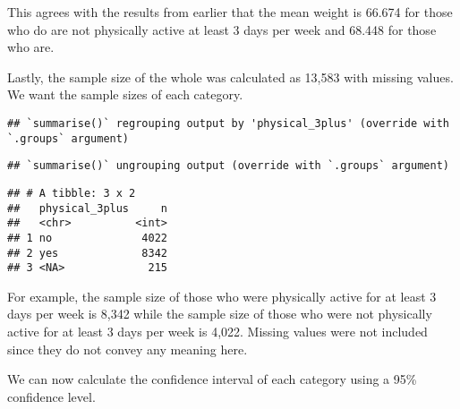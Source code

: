 \documentclass[
]{article}
\newenvironment{Shaded}{\begin{snugshade}}{\end{snugshade}}
\newcommand{\DataTypeTok}[1]{\textcolor[rgb]{0.13,0.29,0.53}{#1}}
\newcommand{\KeywordTok}[1]{\textcolor[rgb]{0.13,0.29,0.53}{\textbf{#1}}}
\newcommand{\NormalTok}[1]{#1}
\newcommand{\OperatorTok}[1]{\textcolor[rgb]{0.81,0.36,0.00}{\textbf{#1}}}
\newcommand{\StringTok}[1]{\textcolor[rgb]{0.31,0.60,0.02}{#1}}
\begin{document}
This agrees with the results from earlier that the mean weight is 66.674
for those who do are not physically active at least 3 days per week and
68.448 for those who are.

Lastly, the sample size of the whole was calculated as 13,583 with
missing values. We want the sample sizes of each category.

\begin{Shaded}
\end{Shaded}

\begin{verbatim}
## `summarise()` regrouping output by 'physical_3plus' (override with `.groups` argument)
\end{verbatim}

\begin{verbatim}
## `summarise()` ungrouping output (override with `.groups` argument)
\end{verbatim}

\begin{verbatim}
## # A tibble: 3 x 2
##   physical_3plus     n
##   <chr>          <int>
## 1 no              4022
## 2 yes             8342
## 3 <NA>             215
\end{verbatim}

For example, the sample size of those who were physically active for at
least 3 days per week is 8,342 while the sample size of those who were
not physically active for at least 3 days per week is 4,022. Missing
values were not included since they do not convey any meaning here.

We can now calculate the confidence interval of each category using a
95\% confidence level.
\end{document}
